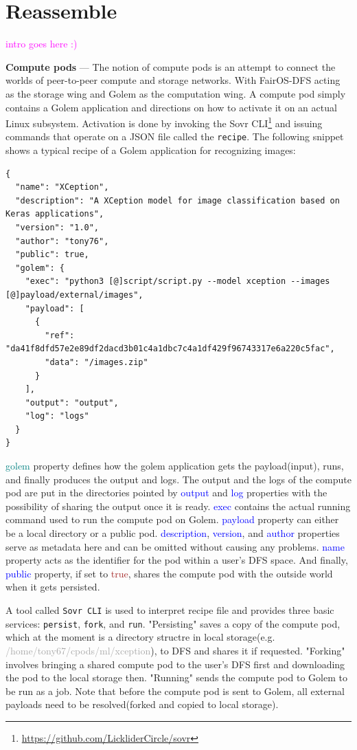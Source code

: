 \documentclass[a4paper, 10pt]{article}
\begin{document}
\section{Reassemble}
\textcolor{magenta}{intro goes here :)}
\par
\textbf{Compute pods} --- The notion of compute pods is an attempt to connect the worlds of peer-to-peer compute and storage networks. With FairOS-DFS acting as the storage wing and Golem as the computation wing. A compute pod simply contains a Golem application and directions on how to activate it on an actual Linux subsystem. Activation is done by invoking the Sovr CLI\footnote{\url{https://github.com/LickliderCircle/sovr}} and issuing commands that operate on a JSON file called the \texttt{recipe}. The following snippet shows a typical recipe of a Golem application for recognizing images:
\begin{verbatim}
{
  "name": "XCeption",
  "description": "A XCeption model for image classification based on Keras applications",
  "version": "1.0",
  "author": "tony76",
  "public": true,
  "golem": {
    "exec": "python3 [@]script/script.py --model xception --images [@]payload/external/images",
    "payload": [
      {
        "ref": "da41f8dfd57e2e89df2dacd3b01c4a1dbc7c4a1df429f96743317e6a220c5fac",
        "data": "/images.zip"
      }
    ],
    "output": "output",
    "log": "logs"
  }
}
\end{verbatim}
\textcolor{teal}{golem} property defines how the golem application gets the payload(input), runs, and finally produces the output and logs. The output and the logs of the compute pod are put in the directories pointed by \textcolor{blue}{output} and \textcolor{blue}{log} properties with the possibility of sharing the output once it is ready. \textcolor{blue}{exec} contains the actual running command used to run the compute pod on Golem. \textcolor{blue}{payload} property can either be a local directory or a public pod. \textcolor{blue}{description}, \textcolor{blue}{version}, and \textcolor{blue}{author} properties serve as metadata here and can be omitted without causing any problems. \textcolor{blue}{name} property acts as the identifier for the pod within a user's DFS space. And finally, \textcolor{blue}{public} property, if set to \textcolor{brown}{true}, shares the compute pod with the outside world when it gets persisted.
\par
A tool called \texttt{Sovr CLI} is used to interpret recipe file and provides three basic services: \texttt{persist}, \texttt{fork}, and \texttt{run}. "Persisting" saves a copy of the compute pod, which at the moment is a directory structre in local storage(e.g. \textcolor{darkgray}{/home/tony67/cpods/ml/xception}), to DFS and shares it if requested. "Forking" involves bringing a shared compute pod to the user's DFS first and downloading the pod to the local storage then. "Running" sends the compute pod to Golem to be run as a job. Note that before the compute pod is sent to Golem, all external payloads need to be resolved(forked and copied to local storage).
\end{document}
